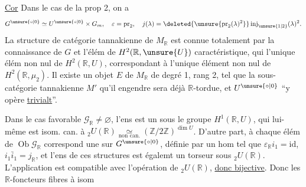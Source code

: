 \uline{Cor} Dans le cas de la prop 2,  on a
\[
G^{\unsure{\circ|0}}\simeq U^{\unsure{\circ|0}}\times G_m,\quad\varepsilon=\operatorname{pr}_2,\quad j(\lambda)=\deleted{\unsure{\operatorname{pr}_2(\lambda)^2}}\operatorname{inj}_{\unsure{1|2}}(\lambda)^2.
\]
La structure  de catégorie tannakienne de $M_{\mathbb R}$ est connue totalement par la connaissance de $G$ et l'élém de $H^2(\mathbb R,\unsure{U})$ caractéristique, qui   l'unique élém non nul de $H^2(\mathbb R,U)$, correspondant à l'unique élément non nul de $H^2(\mathbb R,\mu_2)$. Il existe un  objet $E$ de $M_{\mathbb R}$  de degré 1, rang 2,  tel que la sous-catégorie tannakienne  $M'$ qu'il engendre sera déjà $\mathbb R$-tordue, et    $U^{\unsure{\circ|0}}$ ``y opère \uline{trivialt}''.

Dans le cas favorable $\mathscr G_{\mathbb R}\ne\varnothing$,  l'ens   est un   sous le groupe $H^1(\mathbb R,U)$, qui lui-même est isom. can. à ${}_2U(\mathbb R)\underset{\text{non can.}}{\simeq}(\mathbb Z/2\mathbb Z)^{\dim U}$. D'autre part, à chaque élém de $\operatorname{Ob}\mathscr G_{\mathbb R}$ correspond une   sur $G^{\unsure{\circ|0}}$, définie par un hom
tel que $\varepsilon_{\mathbb R}i_1=\mathrm{id}$, $i_1\bar i_1=j_{\mathbb R}$, et l'ens de ces structures est égalemt un torseur sous ${}_2U(\mathbb R)$. L'application
est compatible avec l'opération de ${}_2U(\mathbb R)$, \uline{donc bijective}. Donc les $\mathbb R$-foncteurs fibres à isom
